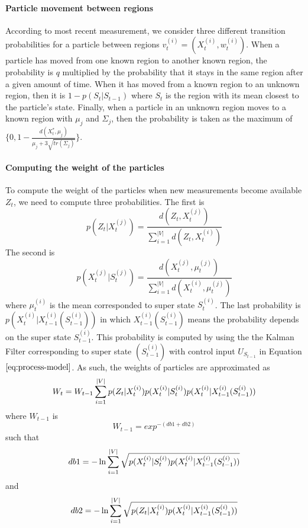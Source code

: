 \documentclass{article}
\begin{document}
\begin{multicols}{2}
    \paragraph{Particle movement between regions} According to most recent measurement, we consider three different transition probabilities for a particle between regions $v_{t}^{(i)}=(X_{t}^{(i)},w_{t}^{(i)})$. When a particle has moved from one known region to another known region, the probability is $q$ multiplied by the probability that it stays in the same region after a given amount of time. When it  has moved from a known region to an unknown region, then it is $1-p(S_t|S_{t-1})$ where $S_t$ is the region with its mean closest to the particle's state. Finally, when a particle in an unknown region moves to a known region with $\mu_j$ and $\Sigma_j$, then the probability is taken as the maximum of $\{0, 1-\frac{d(X_t^*,\mu_j)}{\mu_j+3\sqrt{tr(\Sigma_j)}}\}$.
    
    \paragraph{Computing the weight of the particles} To compute the weight of the particles when new measurements become available $Z_t$, we need to compute three probabilities. The first is 
    \begin{equation}
        p(Z_t|X_{t}^{(j)}) = \frac{d(Z_t,X_{t}^{(j)})}{\sum_{i=1}^{|V|}d(Z_t,X_{t}^{(i)})}
    \end{equation}
    The second is
    \begin{equation}
        p(X_{t}^{(j)}|S_{t}^{(j)}) = \frac{d(X_{t}^{(j)},\mu_{t}^{(j)})}{\sum_{i=1}^{|V|}d(X_{t}^{(i)},\mu_{t}^{(j)})}
    \end{equation}
    where $\mu_{t}^{(i)}$ is the mean corresponded to super state $S_{t}^{(i)}$. 
    The last probability is $p(X_t^{(i)}|X_{t-1}^{(i)}(S_{t-1}^{(i)}))$ in which $X_{t-1}^{(i)}(S_{t-1}^{(i)})$ means the probability depends on the super state $S_{t-1}^{(i)}$. This probability is computed by using the the Kalman Filter corresponding to  super state $(S_{t-1}^{(i)})$ with control input $U_{S_{t-1}}$ in Equation $\ref{eq:process-model}$.  As such, the weights of particles are approximated as 
    \begin{equation}
        \small
        W_t = W_{t-1}\sum_{i=1}^{|V|} p(Z_t|X_t^{(i)})p(X_t^{(i)}|S_t^{(i)})p(X_t^{(i)}|X_{t-1}^{(i)}(S_{t-1}^{(i)}))
    \end{equation}
    where $W_{t-1}$ is 
    \begin{equation}
        W_{t-1} = exp^{-(db1+db2)}
    \end{equation}
    such that
    \begin{equation}
        \small
        db1=-\ln \sum_{i=1}^{|V|} \sqrt{p(X_t^{(i)}|S_t^{(i)})p(X_t^{(i)}|X_{t-1}^{(i)}(S_{t-1}^{(i)}))}
    \end{equation}
    and
    \begin{equation}
        \small
        db2 =  -\ln \sum_{i=1}^{|V|} \sqrt{p(Z_t|X_t^{(i)})p(X_t^{(i)}|X_{t-1}^{(i)}(S_{t-1}^{(i)}))}
    \end{equation}
    

\end{multicols}
\end{document}

